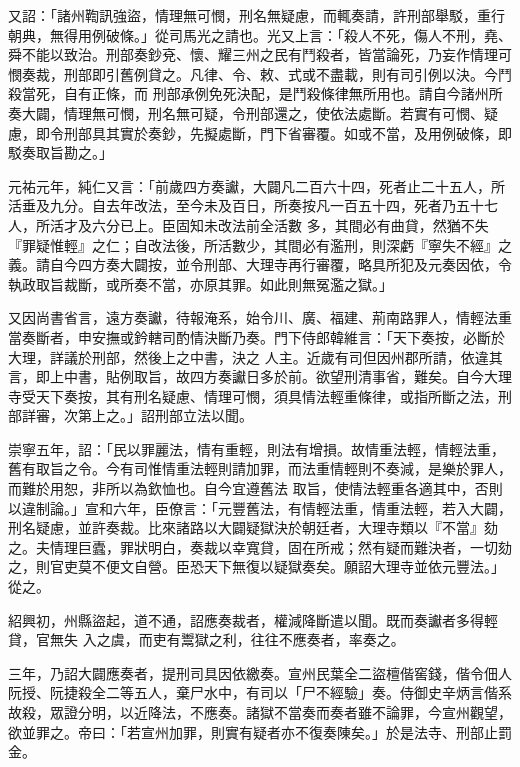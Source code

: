 \begin{pinyinscope}
 又詔：「諸州鞫訊強盜，情理無可憫，刑名無疑慮，而輒奏請，許刑部舉駁，重行朝典，無得用例破條。」從司馬光之請也。光又上言：「殺人不死，傷人不刑，堯、舜不能以致治。刑部奏鈔兗、懷、耀三州之民有鬥殺者，皆當論死，乃妄作情理可憫奏裁，刑部即引舊例貸之。凡律、令、敕、式或不盡載，則有司引例以決。今鬥殺當死，自有正條，而
 刑部承例免死決配，是鬥殺條律無所用也。請自今諸州所奏大闢，情理無可憫，刑名無可疑，令刑部還之，使依法處斷。若實有可憫、疑慮，即令刑部具其實於奏鈔，先擬處斷，門下省審覆。如或不當，及用例破條，即駁奏取旨勘之。」



 元祐元年，純仁又言：「前歲四方奏讞，大闢凡二百六十四，死者止二十五人，所活垂及九分。自去年改法，至今未及百日，所奏按凡一百五十四，死者乃五十七人，所活才及六分已上。臣固知未改法前全活數
 多，其間必有曲貸，然猶不失『罪疑惟輕』之仁；自改法後，所活數少，其間必有濫刑，則深虧『寧失不經』之義。請自今四方奏大闢按，並令刑部、大理寺再行審覆，略具所犯及元奏因依，令執政取旨裁斷，或所奏不當，亦原其罪。如此則無冤濫之獄。」



 又因尚書省言，遠方奏讞，待報淹系，始令川、廣、福建、荊南路罪人，情輕法重當奏斷者，申安撫或鈐轄司酌情決斷乃奏。門下侍郎韓維言：「天下奏按，必斷於大理，詳議於刑部，然後上之中書，決之
 人主。近歲有司但因州郡所請，依違其言，即上中書，貼例取旨，故四方奏讞日多於前。欲望刑清事省，難矣。自今大理寺受天下奏按，其有刑名疑慮、情理可憫，須具情法輕重條律，或指所斷之法，刑部詳審，次第上之。」詔刑部立法以聞。



 崇寧五年，詔：「民以罪麗法，情有重輕，則法有增損。故情重法輕，情輕法重，舊有取旨之令。今有司惟情重法輕則請加罪，而法重情輕則不奏減，是樂於罪人，而難於用恕，非所以為欽恤也。自今宜遵舊法
 取旨，使情法輕重各適其中，否則以違制論。」宣和六年，臣僚言：「元豐舊法，有情輕法重，情重法輕，若入大闢，刑名疑慮，並許奏裁。比來諸路以大闢疑獄決於朝廷者，大理寺類以『不當』劾之。夫情理巨蠹，罪狀明白，奏裁以幸寬貸，固在所戒；然有疑而難決者，一切劾之，則官吏莫不便文自營。臣恐天下無復以疑獄奏矣。願詔大理寺並依元豐法。」從之。



 紹興初，州縣盜起，道不通，詔應奏裁者，權減降斷遣以聞。既而奏讞者多得輕貸，官無失
 入之虞，而吏有鬻獄之利，往往不應奏者，率奏之。



 三年，乃詔大闢應奏者，提刑司具因依繳奏。宣州民葉全二盜檀偕窖錢，偕令佃人阮授、阮捷殺全二等五人，棄尸水中，有司以「尸不經驗」奏。侍御史辛炳言偕系故殺，眾證分明，以近降法，不應奏。諸獄不當奏而奏者雖不論罪，今宣州觀望，欲並罪之。帝曰：「若宣州加罪，則實有疑者亦不復奏陳矣。」於是法寺、刑部止罰金。




\end{pinyinscope}
